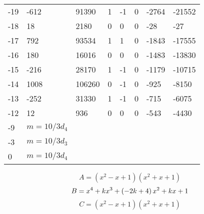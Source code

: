 \documentclass{amsart}
\begin{document}
\begin{longtable}{|l|l|l|lllll|}
-19&-612&91390&1&-1&0&-2764&-21552\\
-18&18&2180&0&0&0&-28&-27\\
-17&792&93534&1&1&0&-1843&-17555\\
-16&180&16016&0&0&0&-1483&-13830\\
-15&-216&28170&1&-1&0&-1179&-10715\\
-14&1008&106260&0&-1&0&-925&-8150\\
-13&-252&31330&1&-1&0&-715&-6075\\
-12&12&936&0&0&0&-543&-4430\\
-9&$m=10/3d_{4}$&&\multicolumn{5}{c|}{}\\
-3&$m=10/3d_{3}$&&\multicolumn{5}{c|}{}\\
0&$m=10/3d_{4}$&&\multicolumn{5}{c|}{}\\
\hline
\end{longtable}
$$A=(x^2
 - x
 + 1)(x^2
 + x
 + 1)$$
$$B=x^4
 + k\*x^3
 + \left(-2\*k
 + 4\right) \*x^2
 + k\*x
 + 1$$
$$C=(x^2
 - x
 + 1)(x^2
 + x
 + 1)$$
\end{document}
